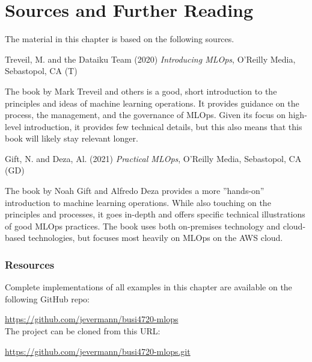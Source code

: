 %
%

\section*{Sources and Further Reading}

The material in this chapter is based on the following sources. 

\begin{tcolorbox}[colback=alert]
Treveil, M. and the Dataiku Team (2020) \emph{Introducing MLOps}, O'Reilly Media, Sebastopol, CA (T) 
\end{tcolorbox}

The book by Mark Treveil and others is a good, short introduction to the principles and ideas of machine learning operations. It provides guidance on the process, the management, and the governance of MLOps. Given its focus on high-level introduction, it provides few technical details, but this also means that this book will likely stay relevant longer. 


\begin{tcolorbox}[colback=alert]
Gift, N. and Deza, Al. (2021) \emph{Practical MLOps}, O'Reilly Media, Sebastopol, CA (GD)
\end{tcolorbox}

The book by Noah Gift and Alfredo Deza provides a more ''hands-on'' introduction to machine learning operations. While also touching on the principles and processes, it goes in-depth and offers specific technical illustrations of good MLOps practices. The book uses both on-premises technology and cloud-based technologies, but focuses most heavily on MLOps on the AWS cloud. 


\begin{tcolorbox}[colback=alert]
\subsubsection*{Resources}
Complete implementations of all examples in this chapter are available on the following GitHub repo:

\url{https://github.com/jevermann/busi4720-mlops} \\

The project can be cloned from this URL:

\url{https://github.com/jevermann/busi4720-mlops.git}
\end{tcolorbox}


